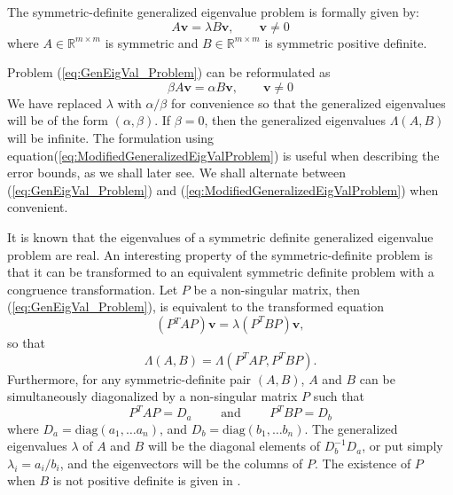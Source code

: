 The symmetric-definite generalized eigenvalue problem is formally given by:
\begin{equation}\label{eq:GenEigVal_Problem}
	A\mathbf{v} = \lambda B\mathbf{v}, \qquad \mathbf{v} \neq 0
\end{equation}
where $A \in \mathbb{R}^{m \times m}$ is symmetric and $B \in \mathbb{R}^{m \times m}$ is symmetric positive definite.

Problem (\ref{eq:GenEigVal_Problem}) can be reformulated  as
\begin{equation}\label{eq:ModifiedGeneralizedEigValProblem}
	\beta A\mathbf{v} = \alpha B\mathbf{v}, \qquad \mathbf{v} \neq 0
\end{equation}
We have replaced $\lambda$ with $\alpha/\beta$ for convenience so that the generalized eigenvalues will be of the form $(\alpha, \beta)$. If $ \beta = 0$, then the generalized eigenvalues $\Lambda(A, B)$ will be infinite. The formulation using equation(\ref{eq:ModifiedGeneralizedEigValProblem}) is useful when describing the error bounds, as we shall later see. We shall alternate between (\ref{eq:GenEigVal_Problem}) and (\ref{eq:ModifiedGeneralizedEigValProblem}) when convenient.

It is known that the eigenvalues of a symmetric definite generalized eigenvalue problem are real. An interesting property of the symmetric-definite problem is that it can be transformed to an equivalent symmetric definite problem with a congruence transformation. Let $P$ be a non-singular matrix, then (\ref{eq:GenEigVal_Problem}), is equivalent to the transformed equation
\begin{equation}\label{eq:CongruenceTransGenEigVal}
	(P{^T}AP) \mathbf{v}= \lambda (P^{T}BP) \mathbf{v},
\end{equation}
so that
\begin{equation}\label{eq:EquivalenceOfEigVals}
	\Lambda(A, B) = \Lambda(P^{T}AP, P^{T}BP).
\end{equation}
Furthermore, for any symmetric-definite pair $(A, B)$, $A$ and $B$ can be simultaneously diagonalized by a non-singular matrix $P$ such that
\begin{equation}\label{eq:SimultaneousDiag}
	P^{T}AP = D_a \qquad \text{ and } \qquad P^TBP = D_b
\end{equation}
where $D_a = \text{diag}(a_1, \ldots a_n) $, and $D_b = \text{diag}(b_1, \ldots b_n) $. The generalized eigenvalues $\lambda$ of $A$ and $B$ will be the diagonal elements of $D^{-1}_bD_a$, or put simply $\lambda_i = a_i/b_i$, and the eigenvectors will be the columns of $P$. The existence of $P$ when $B$ is not positive definite is given in \cite[p.~498]{doi:10.1137/1.9781421407944}.

